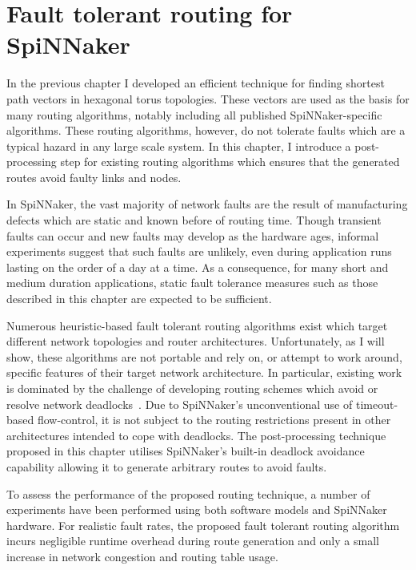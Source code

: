 \chapter{Fault tolerant routing for SpiNNaker}
	
	\label{sec:routing}
	
	In the previous chapter I developed an efficient technique for finding
	shortest path vectors in hexagonal torus topologies. These vectors are used
	as the basis for many routing algorithms, notably including all published
	SpiNNaker-specific algorithms. These routing algorithms, however, do not
	tolerate faults which are a typical hazard in any large scale system. In this
	chapter, I introduce a post-processing step for existing routing algorithms
	which ensures that the generated routes avoid faulty links and nodes.
	
	In SpiNNaker, the vast majority of network faults are the result of
	manufacturing defects which are static and known before of routing time.
	Though transient faults can occur and new faults may develop as the hardware
	ages, informal experiments suggest that such faults are unlikely, even during
	application runs lasting on the order of a day at a time. As a consequence,
	for many short and medium duration applications, static fault tolerance
	measures such as those described in this chapter are expected to be
	sufficient.
	
	Numerous heuristic-based fault tolerant routing algorithms exist which target
	different network topologies and router architectures. Unfortunately, as I
	will show, these algorithms are not portable and rely on, or attempt to work
	around, specific features of their target network architecture. In
	particular, existing work is dominated by the challenge of developing routing
	schemes which avoid or resolve network deadlocks~\cite[chapter~14]{dally04}.
	Due to SpiNNaker's unconventional use of timeout-based flow-control, it is
	not subject to the routing restrictions present in other architectures
	intended to cope with deadlocks. The post-processing technique proposed in
	this chapter utilises SpiNNaker's built-in deadlock avoidance capability
	allowing it to generate arbitrary routes to avoid faults.
	
	To assess the performance of the proposed routing technique, a number of
	experiments have been performed using both software models and SpiNNaker
	hardware. For realistic fault rates, the proposed fault tolerant routing
	algorithm incurs negligible runtime overhead during route generation and only
	a small increase in network congestion and routing table usage.
	
